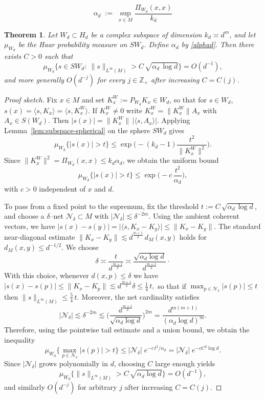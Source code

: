 \documentclass[10pt,a4paper]{amsart}
\newtheorem{theorem}{Theorem}
\begin{document}
 \begin{equation}\label{alphad}
\alpha_d \;:=\; \sup_{x\in M}\frac{\Pi_{W_d}(x,x)}{k_d}
\end{equation}

\begin{theorem}\label{thm:alpha}
Let $W_d\subset H_d$ be a complex subspace of dimension $k_d\asymp d^m$, and let
$\mu_{W_d}$ be the Haar probability measure on $SW_d$.
Define $\alpha_{d}$ by \eqref{alphad}.
Then there exists $C>0$ such that
\[
\mu_{W_d}\Big\{s\in SW_d:\ \|s\|_{L^\infty(M)} > C\,\sqrt{\alpha_d\,\log d}\Big\}
=O(d^{-1}),
\]
and more generally $O(d^{-j})$ for every $j\in\mathbb{Z}_+$ after increasing $C=C(j)$.
\end{theorem}

\begin{proof}[Proof sketch]
Fix $x\in M$ and set $K_x^W:=P_{W_d}K_x\in W_d$, so that for $s\in W_d$,
\(
s(x)=\langle s,K_x\rangle=\langle s,K_x^W\rangle.
\)
If $K_x^W\neq 0$ write $K_x^W=\|K_x^W\|A_x$ with $A_x\in S(W_d)$.
Then
\(
|s(x)|=\|K_x^W\|\,|\langle s,A_x\rangle|.
\)
Applying Lemma~\ref{lem:subspace-spherical} on the sphere $SW_d$ gives
\[
\mu_{W_d}\{|s(x)|>t\}\le 
\exp\!\Big(-(k_d-1)\frac{t^2}{\|K_x^W\|^2}\Big).
\]
Since $\|K_x^W\|^2=\Pi_{W_d}(x,x)\le k_d\alpha_d$, we obtain the uniform bound
\[
\mu_{W_d}\{|s(x)|>t\}
\le
\exp\!\Big(-c\,\frac{t^2}{\alpha_d}\Big),
\]
with $c>0$ independent of $x$ and $d$.

\smallskip
To pass from a fixed point to the supremum, fix the threshold
\(\displaystyle{
t:= C\,\sqrt{\alpha_d\,\log d},}
\)
and choose a $\delta$--net $\mathcal{N}_\delta\subset M$ with
$|\mathcal{N}_\delta|\lesssim \delta^{-2m}$.
Using the ambient coherent vectors, we have
\(\displaystyle{
|s(x)-s(y)|
=\big|\langle s,K_x-K_y\rangle\big|
\le \|K_x-K_y\|
}\). The standard near-diagonal estimate
$
\|K_x-K_y\|\lesssim d^{\frac{m+1}{2}}\,d_{M}(x,y)$
holds for $d_{M}(x,y)\le d^{-1/2}$. 
We choose
\[
\delta \asymp \frac{t}{d^{\frac{m+1}{2}}}
\asymp \frac{\sqrt{\alpha_d\log d}}{d^{\frac{m+1}{2}}}\cdot
\]
With this choice, whenever $d(x,p)\le\delta$ we have
\(\displaystyle{
|s(x)-s(p)|
\le \|K_x-K_p\|
\lesssim d^{\frac{m+1}{2}}\delta
\le \frac14\,t,
}\)
so that if $\max_{p\in\mathcal{N}_\delta}|s(p)|\le t$ then
\(\displaystyle{
\|s\|_{L^\infty(M)}\le \frac54\,t.}
\)
Moreover, the net cardinality satisfies
\[
|\mathcal{N}_\delta|
\lesssim \delta^{-2m}
\lesssim
\Big(\frac{d^{\frac{m+1}{2}}}{\sqrt{\alpha_d\log d}}\Big)^{2m}
=
\frac{d^{m(m+1)}}{(\alpha_d\log d)^m}.
\]
Therefore, using the pointwise tail estimate and a union bound, we obtain the inequality
\[
\mu_{W_d}\Big\{\max_{p\in\mathcal{N}_\delta}|s(p)|>t\Big\}
\le
|\mathcal{N}_\delta|\;e^{-c\,t^2/\alpha_d}
=
|\mathcal{N}_\delta|\;e^{-cC^2\log d}.
\]
Since $|\mathcal{N}_\delta|$ grows polynomially in $d$, choosing $C$ large enough yields
\[
\mu_{W_d}\Big\{\|s\|_{L^\infty(M)}>C\,\sqrt{\alpha_d\log d}\Big\}
=O(d^{-1}),
\]
and similarly $O(d^{-j})$ for arbitrary $j$ after increasing $C=C(j)$.
\end{proof}
\end{document}
